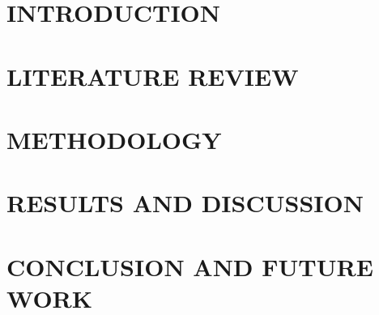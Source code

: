 \documentclass[12pt,twoside]{article}
\begin{document}
\cleardoublepage

\renewcommand{\contentsname}{TABLE OF CONTENTS}
\tableofcontents
\pagebreak
\listoffigures
\listoftables
\cleardoublepage
{}

\section{INTRODUCTION}

\cleardoublepage

\section{LITERATURE REVIEW}

\cleardoublepage

\section{METHODOLOGY}

\cleardoublepage

\section{RESULTS AND DISCUSSION}

\cleardoublepage

\section{CONCLUSION AND FUTURE WORK}

\cleardoublepage

\printbibliography[title={REFERENCES},heading=bibnumbered]
\cleardoublepage

\appendix

\cleardoublepage

\cleardoublepage

\end{document}
